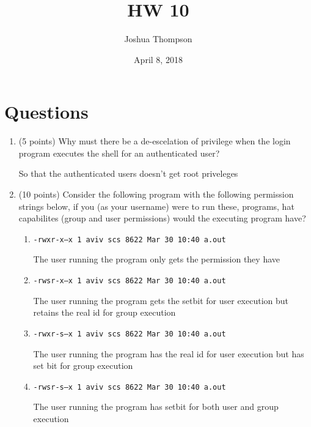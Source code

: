 \documentclass{article}[9pt]
\title{HW 10}
\author{Joshua Thompson}
\date{April 8, 2018}
\newenvironment{answerfont}{\fontfamily{qhv}\selectfont}{\par}
\newenvironment{myanswer}{\begin{mdframed}\begin{answerfont}}{\end{answerfont}\end{mdframed}}
\begin{document}
\maketitle
\section*{Questions}
\label{sec:org3ac93b9}

\begin{enumerate}
\item (5 points) Why must there be a de-escelation of privilege when the login program executes the shell for an authenticated user?

\begin{myanswer}
So that the authenticated users doesn't get root priveleges
\end{myanswer}


\item (10 points) Consider the following program with the following permission strings below, if you (as your username) were to run these, programs, hat capabilites (group and user permissions) would the executing program have?

\begin{enumerate}
\item \texttt{-rwxr-x--x 1 aviv scs 8622 Mar 30 10:40 a.out}

  \begin{myanswer}
  The user running the program only gets the permission they have
  \end{myanswer}


\item \texttt{-rwsr-x--x 1 aviv scs 8622 Mar 30 10:40 a.out}

  \begin{myanswer}
  The user running the program gets the setbit for user execution but retains the real id for group execution
  \end{myanswer}

\item \texttt{-rwxr-s--x 1 aviv scs 8622 Mar 30 10:40 a.out}

  \begin{myanswer}
  The user running the program has the real id for user execution but has set bit for group execution
  \end{myanswer}

\item \texttt{-rwsr-s--x 1 aviv scs 8622 Mar 30 10:40 a.out}

  \begin{myanswer}
  The user running the program has setbit for both user and group execution
  \end{myanswer}
\end{enumerate}


\end{enumerate}
\end{document}
